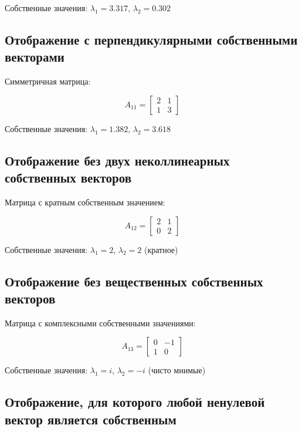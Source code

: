 Собственные значения: $\lambda_1 = 3.317$, $\lambda_2 = 0.302$

\subsection*{Отображение с перпендикулярными собственными векторами}

Симметричная матрица:

\begin{equation}
A_{11} = \begin{bmatrix} 2 & 1 \\ 1 & 3 \end{bmatrix}
\end{equation}

Собственные значения: $\lambda_1 = 1.382$, $\lambda_2 = 3.618$

\subsection*{Отображение без двух неколлинеарных собственных векторов}

Матрица с кратным собственным значением:

\begin{equation}
A_{12} = \begin{bmatrix} 2 & 1 \\ 0 & 2 \end{bmatrix}
\end{equation}

Собственные значения: $\lambda_1 = 2$, $\lambda_2 = 2$ (кратное)

\subsection*{Отображение без вещественных собственных векторов}

Матрица с комплексными собственными значениями:

\begin{equation}
A_{13} = \begin{bmatrix} 0 & -1 \\ 1 & 0 \end{bmatrix}
\end{equation}

Собственные значения: $\lambda_1 = i$, $\lambda_2 = -i$ (чисто мнимые)

\subsection*{Отображение, для которого любой ненулевой вектор является собственным}

